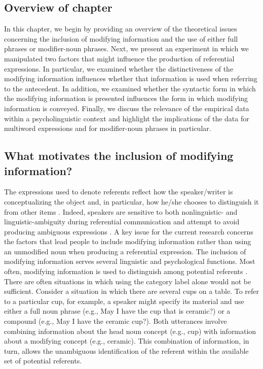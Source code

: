\documentclass[output=paper]{langsci/langscibook}
\begin{document}
\subsection{Overview of chapter}

In this chapter, we begin by providing an overview of the theoretical
issues concerning the inclusion of modifying information and the use
of either full phrases or modifier-noun phrases. Next, we present an
experiment in which we manipulated two factors that might influence
the production of referential expressions. In particular, we examined
whether the distinctiveness of the modifying information influences
whether that information is used when referring to the antecedent. In
addition, we examined whether the syntactic form in which the
modifying information is presented influences the form in which
modifying information is conveyed. Finally, we discuss the relevance
of the empirical data within a psycholinguistic context and highlight
the implications of the data for multiword expressions and for
modifier-noun phrases in particular.

\subsection{What motivates the inclusion of modifying information?}

The expressions used to denote referents reflect how the
speaker/writer is conceptualizing the object and, in particular, how
he/she chooses to distinguish it from other items \citep{brown1958shall,olson1970language}. Indeed, speakers are sensitive to both nonlinguistic- and
linguistic-ambiguity during referential communication and attempt to
avoid producing ambiguous expressions \citep{ferreira2005speakers}. A key issue for the current research concerns the factors that
lead people to include modifying information rather than using an
unmodified noun when producing a referential expression. The inclusion
of modifying information serves several linguistic and psychological
functions. Most often, modifying information is used to distinguish
among potential referents \citep{downing1977creation,brekle1986production}. There are often
situations in which using the category label alone would not be
sufficient. Consider a situation in which there are several cups on a
table. To refer to a particular cup, for example, a speaker might
specify its material and use either a full noun phrase (e.g., May I
have the cup that is ceramic?) or a compound (e.g., May I have the
ceramic cup?). Both utterances involve combining information about the
head noun concept (e.g., cup) with information about a modifying
concept (e.g., ceramic). This combination of information, in turn,
allows the unambiguous identification of the referent within the
available set of potential referents.
\end{document}
